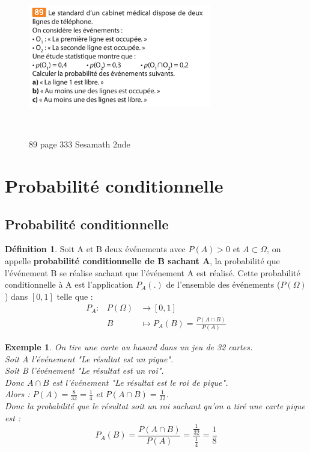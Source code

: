 \documentclass[a4paper,12pt,final]{article}
\newtheorem{Ex}{Exemple}[section]
\theoremstyle{theorem}
\theoremstyle{definition}
\theoremstyle{definition}
\theoremstyle{definition}
\newtheorem{Def}{Définition}[section]
\begin{document}
		\begin{figure}[h!]
			\centering
			\includegraphics[width=8cm,height=7cm]{Sesamath2de_89p333.pdf}
			\caption{89 page 333 Sesamath 2nde}
			\label{fig:sesamath2de89p333}
		\end{figure}
	
\newpage	
\section{Probabilité conditionnelle}
	\subsection{Probabilité conditionnelle}
	
		\begin{Def}
			Soit A et B deux événements avec $P(A) > 0$ et $A\subset \Omega$, on appelle \textbf{probabilité conditionnelle de B sachant A}, la probabilité que l'événement B se réalise sachant que l'événement A est réalisé. Cette probabilité conditionnelle à A est l'application $P_{A}(.)$ de l'ensemble des événements ($P(\Omega)$) dans $[0,1]$ telle que :
			\[ \begin{array}{lll}
					P_{A} : &P(\Omega) &\rightarrow [0,1] \\
					&B &\mapsto P_{A}(B) = \frac{P(A\cap B)}{P(A)}
				\end{array}
			       \]
		\end{Def}
	
		\begin{Ex}
			On tire une carte au hasard dans un jeu de 32 cartes. \\
			Soit A l'événement "Le résultat est un pique". \\
			Soit B l'événement "Le résultat est un roi". \\
			Donc $A\cap B$ est l'événement "Le résultat est le roi de pique". \\
			Alors : $P(A) = \frac{8}{32} = \frac{1}{4}$ et $P(A\cap B) = \frac{1}{32}$. \\
			Donc la probabilité que le résultat soit un roi sachant qu'on a tiré une carte pique est : 
			\[P_{A}(B) = \frac{P(A\cap B)}{P(A)} = \frac{\frac{1}{32}}{\frac{1}{4}} = \frac{1}{8}\]
		\end{Ex}
	
\end{document}
